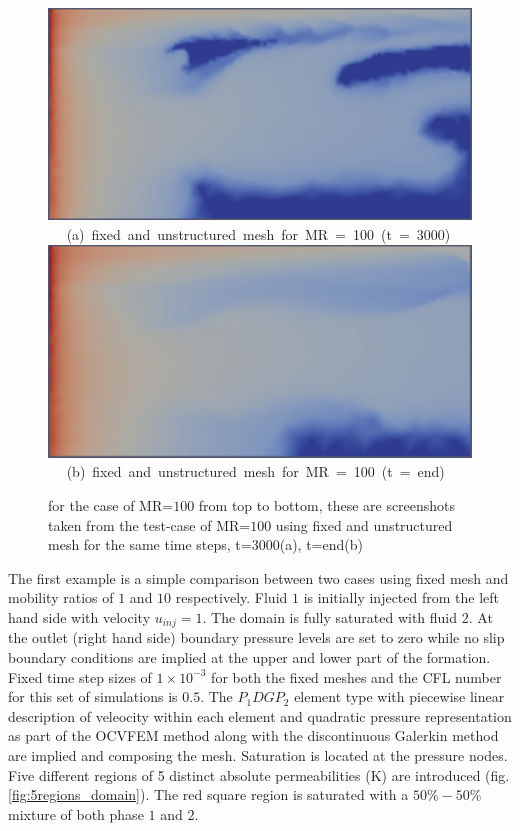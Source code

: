 \documentclass[preprint,authoryear,12pt]{elsarticle}
\begin{document}
\begin{figure}[h]
\vbox{
\hbox{\hspace{3.5cm}
\includegraphics[width=.5\textwidth]{./Pics1/mr100_fixed/mr100_fixed_3000.pdf} 
}
\vspace{0.0cm}
\hbox{\hspace{5.0cm} (a) fixed and unstructured mesh for MR = 100 (t = 3000)   
}
\hbox{\hspace{3.5cm}
\includegraphics[width=.5\textwidth]{./Pics1/mr100_fixed/mr100_fixed_end.pdf}
}
\vspace{0.0cm}
\hbox{\hspace{5.0cm} (b) fixed and unstructured mesh for MR = 100 (t = end)   
}
}     
\caption{for the case of MR=$100$ from top to bottom, these are screenshots taken from the test-case of MR=$100$ using fixed and unstructured mesh for the same time steps, t=3000(a), t=end(b) }
\label{fig:4testcase_b}
\end{figure}



\medskip
The first example is a simple comparison between two cases using fixed mesh and mobility ratios of $1$ and $10$ respectively. 
Fluid $1$ is initially injected from the left hand side with velocity $u_{inj}=1$. The domain is fully saturated with fluid $2$. At the outlet (right hand side) boundary pressure levels are set to zero while no slip boundary conditions are implied at the upper and lower part of the formation. Fixed time step sizes of $1 \times 10^{-3}$ for both the fixed meshes and the CFL number for this set of simulations is $0.5$. The $P_{1}DGP_{2}$ element type with piecewise linear description of veleocity within each element and quadratic pressure representation as part of the OCVFEM method along with the discontinuous Galerkin method are implied and composing the mesh. Saturation is located at the pressure nodes. Five different regions of 5 distinct absolute permeabilities (K) are introduced (fig.\ref{fig:5regions_domain}). The red square region is saturated with a $50\%-50\%$ mixture of both phase $1$ and $2$. 
\end{document}
